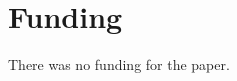\documentclass[pdflatex,sn-mathphys-num]{sn-jnl}
\theoremstyle{thmstyleone}%
\theoremstyle{thmstyletwo}%
\theoremstyle{thmstylethree}%
\begin{document}
\section*{Funding}
There was no funding for the paper.






\end{document}
